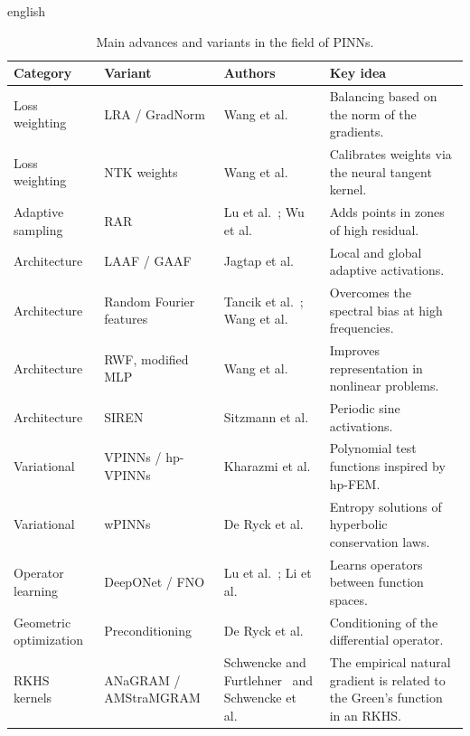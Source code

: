 \documentclass[0000.tex]{subfiles}
\begin{document}
\begin{hyphenrules}{english}
\begin{table}[htbp]
  \centering
  \caption{Main advances and variants in the field of PINNs.}
  \label{tab:pinn-variants}
  \small
  \begin{tabularx}{\linewidth}{@{}llXX@{}}
    \toprule
    Category & Variant & Authors & Key idea \\
    \midrule
    Loss weighting & LRA / GradNorm & Wang et al.~\cite{wang2021gradient} & Balancing based on the norm of the gradients. \\
    Loss weighting & NTK weights & Wang et al.~\cite{wang2022ntk} & Calibrates weights via the neural tangent kernel. \\
    Adaptive sampling & RAR & Lu et al.~\cite{lu2021deepxde}; Wu et al.~\cite{wu2023sampling} & Adds points in zones of high residual. \\
    Architecture & LAAF / GAAF & Jagtap et al.~\cite{jagtap2020a,jagtap2020b} & Local and global adaptive activations. \\
    Architecture & Random Fourier features & Tancik et al.~\cite{tancik2020}; Wang et al.~\cite{wang2021eigenvector} & Overcomes the spectral bias at high frequencies. \\
    Architecture & RWF, modified MLP & Wang et al.~\cite{wang2022rwf,wang2023expert} & Improves representation in nonlinear problems. \\
    Architecture & SIREN & Sitzmann et al.~\cite{sitzmann2020} & Periodic sine activations. \\
    Variational & VPINNs / hp-VPINNs & Kharazmi et al.~\cite{kharazmi2019,kharazmi2021} & Polynomial test functions inspired by hp-FEM. \\
    Variational & wPINNs & De Ryck et al.~\cite{deryck2024wpinn} & Entropy solutions of hyperbolic conservation laws. \\
    Operator learning & DeepONet / FNO & Lu et al.~\cite{lu2021deeponet}; Li et al.~\cite{li2021fno} & Learns operators between function spaces. \\
    Geometric optimization & Preconditioning & De Ryck et al.~\cite{deryck2024operator} & Conditioning of the differential operator. \\
    RKHS kernels & ANaGRAM / AMStraMGRAM & Schwencke and Furtlehner~\cite{schwencke2025anagram} and Schwencke et al.~\cite{schwencke2025amstram} & The empirical natural gradient is related to the Green's function in an RKHS. \\
    \bottomrule
  \end{tabularx}
\end{table}


\end{hyphenrules}
\end{document}
